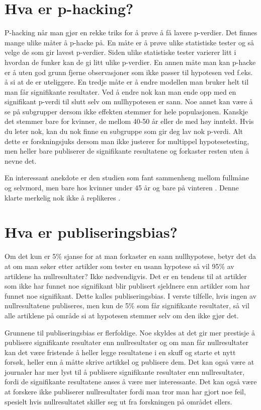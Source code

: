 \documentclass[doc,norsk]{apa7}
\begin{document}
\section{Hva er p-hacking?}
P-hacking når man gjør en rekke triks for å prøve å få lavere p-verdier. Det finnes mange ulike måter å p-hacke på. En måte er å prøve ulike statistiske tester og så velge de som gir lavest p-verdier. Siden ulike statistiske tester varierer litt i hvordan de funker kan de gi litt ulike p-verdier. En annen måte man kan p-hacke er å uten god grunn fjerne observasjoner som ikke passer til hypotesen ved f.eks. å si at de er uteliggere. En tredje måte er å endre modellen man bruker helt til man får signifikante resultater. Ved å endre nok kan man ende opp med en signifikant p-verdi til slutt selv om nullhypotesen er sann. Noe annet kan være å se på subgrupper dersom ikke effekten stemmer for hele populasjonen. Kanskje det stemmer bare for kvinner, de mellom 40-50 år eller de med høy inntekt. Hvis du leter nok, kan du nok finne en subgruppe som gir deg lav nok p-verdi. Alt dette er forskningsjuks dersom man ikke justerer for multippel hypotesetesting, men heller bare publiserer de signifikante resultatene og forkaster resten uten å nevne det.

En interessant anekdote er den studien som fant sammenheng mellom fullmåne og selvmord, men bare hos kvinner under 45 år og bare på vinteren \parencite{selvmord-vinter-2}. Denne klarte merkelig nok ikke å replikeres \parencite{selvmord-vinter}.

\section{Hva er publiseringsbias?}
Om det kun er 5\% sjanse for at man forkaster en sann nullhypotese, betyr det da at om man søker etter artikler som tester en usann hypotese så vil 95\% av artiklene ha nullresultater? Ikke nødvendigvis. Det er en tendens til at artikler som ikke har funnet noe signifikant blir publisert sjeldnere enn artikler som har funnet noe signifikant. Dette kalles publiseringsbias. I verste tilfelle, hvis ingen av nullresultatene publiseres, men kun de 5\% som får signifikante resultater, så vil alle artiklene på område si at hypotesen stemmer selv om den ikke gjør det.

Grunnene til publiseringsbias er flerfoldige. Noe skyldes at det gir mer prestisje å publisere signifikante resultater enn nullresultater og om man får nullresultater kan det være fristende å heller legge resultatene i en skuff og starte et nytt forsøk, heller enn å måtte skrive artikkel og publisere dem. Det kan også være at journaler har mer lyst til å publisere signifikante resultater enn nullresultater, fordi de signifikante resultatene anses å være mer interessante. Det kan også være at forskere ikke publiserer nullresultater fordi man tror man har gjort noe feil, spesielt hvis nullresultatet skiller seg ut fra forskningen på området ellers.
\end{document}
